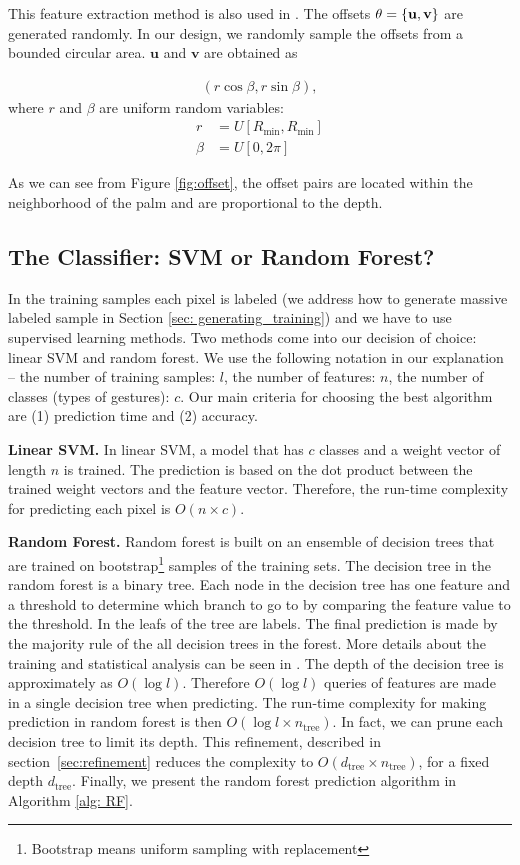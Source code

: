 This feature extraction method is also used in \cite{shotton2011}. The offsets $\theta=\{\bf{u}, \bf{v} \}$ are generated randomly. In our design, we randomly sample the offsets from a bounded circular area. $\textbf{u}$ and $\textbf{v}$ are obtained as

\begin{align}
\label{enq: offest}
 (r \cos \beta, r \sin \beta),
\end{align}
where $r$ and $\beta$ are uniform random variables:
\begin{align}
 r &= U[R_{\text{min}}, R_{\text{min}}]
 \label{eqn: radius} 
 \\
 \beta &= U[0, 2\pi]
\end{align}

As we can see from Figure \ref{fig:offset}, the offset pairs are located within the neighborhood of the palm and are proportional to the depth.

\cutsection
\subsection{The Classifier: SVM or Random Forest?}
\cutsection

In the training samples each pixel is labeled (we address how to generate massive labeled sample in Section \ref{sec: generating_training}) and we have to use supervised learning methods. Two methods come into our decision of choice: linear SVM and random forest. We use the following notation in our explanation -- the number of training samples: $l$, the number of features: $n$, the number of classes (types of gestures): $c$. Our main criteria for choosing the best algorithm are (1) prediction time and (2) accuracy.

\textbf{Linear SVM.} In linear SVM, a model that has $c$ classes and a weight vector of length $n$ is trained. The prediction is based on the dot product between the trained weight vectors and the feature vector. Therefore, the run-time complexity for predicting each pixel is $O(n\times c)$.

\textbf{Random Forest.} Random forest is built on an ensemble of decision trees that are trained on  bootstrap\footnote{Bootstrap means uniform   sampling with replacement} samples of the training sets. The decision tree in the random forest is a binary tree. Each node in the decision tree has one feature and a threshold to determine which branch to go to by comparing the feature value to the threshold. In the leafs of the tree are labels. The final prediction is made by the majority rule of the all decision trees in the forest. More details about the training and statistical analysis can be seen in \cite{lepetit2005}. The depth of the decision tree is approximately as $O(\log l)$. Therefore $O(\log l)$ queries of features are made in a single decision tree when predicting. The run-time complexity for making prediction in random forest is then $O(\log l \times n_{\text{tree}})$. In fact, we can prune each decision tree to limit its depth. This refinement, described in section~\ref{sec:refinement} reduces the complexity to $O(d_{\text{tree}}\times n_{\text{tree}})$, for a fixed depth $d_{\text{tree}}$. Finally, we present the random forest prediction algorithm in Algorithm \ref{alg: RF}.


